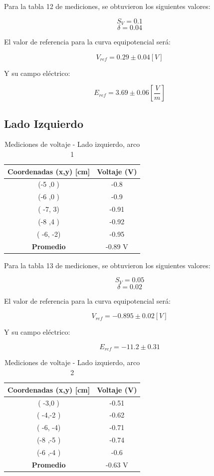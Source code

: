 \documentclass[11pt,twocolumn]{article}
\begin{document}
Para la tabla 12 de mediciones, se obtuvieron los siguientes valores:

\[S_V = 0.1\]
\[\delta = 0.04\]

El valor de referencia para la curva equipotencial será:

\[V_{ref} = 0.29 \pm 0.04 [V]\]

Y su campo eléctrico:

\[E_{ref} = 3.69 \pm 0.06 [\frac{V}{m}]\]

\subsection*{Lado Izquierdo}

\begin{table}[h]
\centering
\caption{Mediciones de voltaje - Lado izquierdo, arco 1}
\begin{tabular}{cc}
\toprule
\textbf{Coordenadas (x,y) [cm]} & \textbf{Voltaje (V)} \\
\midrule
(-5 ,0 ) &  -0.8\\
(-6 ,0 ) &  -0.9\\
( -7, 3) &  -0.91\\
(-8 ,4 ) &  -0.92\\
( -6, -2) &  -0.95\\
\midrule
\textbf{Promedio} &  -0.89 V\\
\bottomrule
\end{tabular}
\end{table}

Para la tabla 13 de mediciones, se obtuvieron los siguientes valores:

\[S_V = 0.05\]
\[\delta = 0.02\]

El valor de referencia para la curva equipotencial será:

\[V_{ref} = -0.895 \pm 0.02 [V]\]

Y su campo eléctrico:

\[E_{ref} = -11.2 \pm 0.31\]

\begin{table}[h]
\centering
\caption{Mediciones de voltaje - Lado izquierdo, arco 2}
\begin{tabular}{cc}
\toprule
\textbf{Coordenadas (x,y) [cm]} & \textbf{Voltaje (V)} \\
\midrule
( -3,0 ) &  -0.51 \\
( -4,-2 ) &  -0.62\\
( -6, -4) &  -0.71\\
(-8 ,-5 ) &  -0.74\\
(-6 ,-4 ) & -0.6 \\
\midrule
\textbf{Promedio} &  -0.63 V\\
\bottomrule
\end{tabular}
\end{table}
\end{document}
